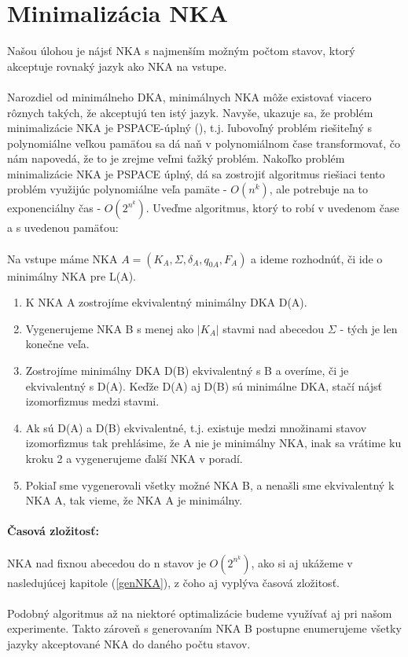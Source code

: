 \section{Minimalizácia NKA}

Našou úlohou je nájsť NKA s najmenším možným počtom stavov, ktorý akceptuje rovnaký jazyk ako NKA na vstupe.
\paragraph{}
Narozdiel od minimálneho DKA, minimálnych NKA môže existovať viacero rôznych takých, že akceptujú ten istý jazyk.
Navyše, ukazuje sa, že problém minimalizácie NKA je PSPACE-úplný (\cite{jiang}), t.j. ľubovoľný problém riešiteľný s polynomiálne veľkou pamäťou sa dá naň v polynomiálnom čase transformovať, čo nám napovedá, že to je zrejme veľmi ťažký problém. 
Nakoľko problém minimalizácie NKA je PSPACE úplný, dá sa zostrojiť algoritmus riešiaci tento problém využijúc polynomiálne veľa pamäte - $O(n^k)$, ale potrebuje na to exponenciálny čas - $O(2^{n^k})$. Uveďme algoritmus, ktorý to robí v uvedenom čase a s uvedenou pamäťou:
\paragraph{}
Na vstupe máme NKA $A=(K_A,\Sigma,\delta_A,q_{0A},F_A)$ a ideme rozhodnúť, či ide o minimálny NKA pre L(A).
\\
\begin{enumerate}
  \item K NKA A zostrojíme ekvivalentný minimálny DKA D(A).
  \item Vygenerujeme NKA B s menej ako $|K_A|$ stavmi nad abecedou $\Sigma$ - tých je len konečne veľa.
  \item Zostrojíme minimálny DKA D(B) ekvivalentný s B a overíme, či je ekvivalentný s D(A). Keďže D(A) aj D(B) sú minimálne DKA, stačí nájsť izomorfizmus medzi stavmi.
  \item Ak sú D(A) a D(B) ekvivalentné, t.j. existuje medzi množinami stavov izomorfizmus tak prehlásime, že A nie je minimálny NKA, inak sa vrátime ku kroku 2 a vygenerujeme ďalší NKA v poradí.
  \item Pokiaľ sme vygenerovali všetky možné NKA B, a nenašli sme ekvivalentný k NKA A, tak vieme, že NKA A je minimálny.
\end{enumerate}

\paragraph{Časová zložitosť: }
NKA nad fixnou abecedou do n stavov je $O(2^{n^k})$, ako si aj ukážeme v nasledujúcej kapitole (\ref{genNKA}), z čoho aj vyplýva časová zložitosť.

\paragraph{}
Podobný algoritmus až na niektoré optimalizácie budeme využívať aj pri našom experimente. Takto zároveň s generovaním NKA B postupne enumerujeme všetky jazyky akceptované NKA do daného počtu stavov.